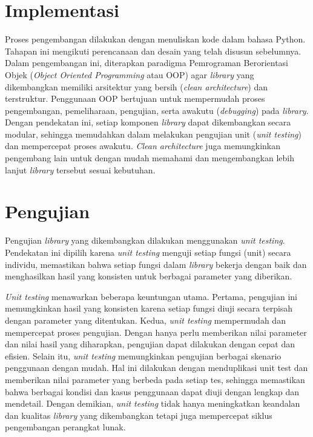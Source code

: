 \section{Implementasi}
Proses pengembangan dilakukan dengan menuliskan kode dalam bahasa Python. Tahapan ini mengikuti perencanaan dan desain yang telah disusun sebelumnya. Dalam pengembangan ini, diterapkan paradigma Pemrograman Berorientasi Objek (\textit{Object Oriented Programming} atau OOP) agar \textit{library} yang dikembangkan memiliki arsitektur yang bersih (\textit{clean architecture}) dan terstruktur. Penggunaan OOP bertujuan untuk mempermudah proses pengembangan, pemeliharaan, pengujian, serta awakutu (\textit{debugging}) pada \textit{library}. Dengan pendekatan ini, setiap komponen \textit{library} dapat dikembangkan secara modular, sehingga memudahkan dalam melakukan pengujian unit (\textit{unit testing}) dan mempercepat proses awakutu. \textit{Clean architecture} juga memungkinkan pengembang lain untuk dengan mudah memahami dan mengembangkan lebih lanjut \textit{library} tersebut sesuai kebutuhan.

\section{Pengujian}
Pengujian \textit{library} yang dikembangkan dilakukan menggunakan \textit{unit testing}. Pendekatan ini dipilih karena \textit{unit testing} menguji setiap fungsi (unit) secara individu, memastikan bahwa setiap fungsi dalam \textit{library} bekerja dengan baik dan menghasilkan hasil yang konsisten untuk berbagai parameter yang diberikan.

\textit{Unit testing} menawarkan beberapa keuntungan utama. Pertama, pengujian ini memungkinkan hasil yang konsisten karena setiap fungsi diuji secara terpisah dengan parameter yang ditentukan. Kedua, \textit{unit testing} mempermudah dan mempercepat proses pengujian. Dengan hanya perlu memberikan nilai parameter dan nilai hasil yang diharapkan, pengujian dapat dilakukan dengan cepat dan efisien. Selain itu, \textit{unit testing} memungkinkan pengujian berbagai skenario penggunaan dengan mudah. Hal ini dilakukan dengan menduplikasi unit test dan memberikan nilai parameter yang berbeda pada setiap tes, sehingga memastikan bahwa berbagai kondisi dan kasus penggunaan dapat diuji dengan lengkap dan mendetail. Dengan demikian, \textit{unit testing} tidak hanya meningkatkan keandalan dan kualitas \textit{library} yang dikembangkan tetapi juga mempercepat siklus pengembangan perangkat lunak.
